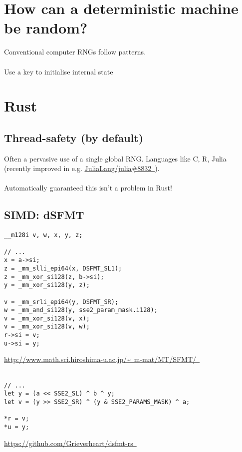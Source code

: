 \documentclass[14pt]{beamer}
\newcommand{\exturl}[1]{\exthref{#1}{#1}}
\newcommand{\exthref}[2]{\href{#1}{#2\ \footnotesize\faExternalLink}}
\begin{document}
\section{How can a deterministic machine be random?}
\begin{frame}
  Conventional computer RNGs follow patterns. \\~\\

  Use a key to initialise internal state
\end{frame}


\section{Rust}

\subsection[Thread-safety]{Thread-safety (by default)}
\begin{frame}
  Often a pervasive use of a single global RNG\@.
  Languages like C, R, Julia (recently improved in e.g. \exthref{https://github.com/JuliaLang/julia/pull/8832}{JuliaLang/julia\#8832}).\\~\\

  Automatically guaranteed this isn't a problem in Rust!
\end{frame}

\subsection{SIMD: dSFMT}
\begin{frame}[fragile]
  \fontsize{8pt}{8pt}\selectfont
  \begin{verbatim}
__m128i v, w, x, y, z;

// ...
x = a->si;
z = _mm_slli_epi64(x, DSFMT_SL1);
z = _mm_xor_si128(z, b->si);
y = _mm_xor_si128(y, z);

v = _mm_srli_epi64(y, DSFMT_SR);
w = _mm_and_si128(y, sse2_param_mask.i128);
v = _mm_xor_si128(v, x);
v = _mm_xor_si128(v, w);
r->si = v;
u->si = y;
  \end{verbatim}

  \begin{flushright}
    \exthref{http://www.math.sci.hiroshima-u.ac.jp/~\%20m-mat/MT/SFMT/}{http://www.math.sci.hiroshima-u.ac.jp/\textasciitilde\ m-mat/MT/SFMT/}\\~\\
  \end{flushright}
\pause

  \begin{verbatim}
// ...
let y = (a << SSE2_SL) ^ b ^ y;
let v = (y >> SSE2_SR) ^ (y & SSE2_PARAMS_MASK) ^ a;

*r = v;
*u = y;
  \end{verbatim}

  \begin{flushright}
    \exturl{https://github.com/Grieverheart/dsfmt-rs}
  \end{flushright}
\end{frame}
\end{document}
